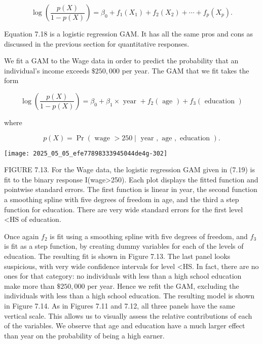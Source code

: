 \documentclass[10pt]{article}
\begin{document}
\begin{equation*}
\log \left(\frac{p(X)}{1-p(X)}\right)=\beta_{0}+f_{1}\left(X_{1}\right)+f_{2}\left(X_{2}\right)+\cdots+f_{p}\left(X_{p}\right) . \tag{7.18}
\end{equation*}


Equation 7.18 is a logistic regression GAM. It has all the same pros and cons as discussed in the previous section for quantitative responses.

We fit a GAM to the Wage data in order to predict the probability that an individual's income exceeds $\$ 250,000$ per year. The GAM that we fit takes the form


\begin{equation*}
\log \left(\frac{p(X)}{1-p(X)}\right)=\beta_{0}+\beta_{1} \times \text { year }+f_{2}(\text { age })+f_{3}(\text { education }) \tag{7.19}
\end{equation*}


where

$$
p(X)=\operatorname{Pr}(\text { wage }>250 \mid \text { year }, \text { age }, \text { education }) .
$$

\begin{center}
\texttt{[image: 2025\_05\_05\_efe77898333945044de4g-302]}
\end{center}

FIGURE 7.13. For the Wage data, the logistic regression GAM given in (7.19) is fit to the binary response I(wage>250). Each plot displays the fitted function and pointwise standard errors. The first function is linear in year, the second function a smoothing spline with five degrees of freedom in age, and the third a step function for education. There are very wide standard errors for the first level <HS of education.

Once again $f_{2}$ is fit using a smoothing spline with five degrees of freedom, and $f_{3}$ is fit as a step function, by creating dummy variables for each of the levels of education. The resulting fit is shown in Figure 7.13. The last panel looks suspicious, with very wide confidence intervals for level <HS. In fact, there are no ones for that category: no individuals with less than a high school education make more than $\$ 250,000$ per year. Hence we refit the GAM, excluding the individuals with less than a high school education. The resulting model is shown in Figure 7.14. As in Figures 7.11 and 7.12, all three panels have the same vertical scale. This allows us to visually assess the relative contributions of each of the variables. We observe that age and education have a much larger effect than year on the probability of being a high earner.
\end{document}
